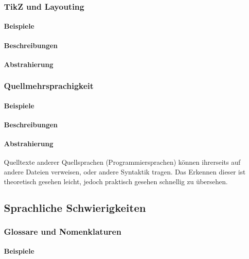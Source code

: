 \subsubsection{TikZ und Layouting}\label{problems:advanced:layouting}
\paragraph*{Beispiele}
\paragraph*{Beschreibungen}
\paragraph*{Abstrahierung}

\subsubsection{Quellmehrsprachigkeit}\label{problems:special:sourcecode}
\paragraph*{Beispiele}
\paragraph*{Beschreibungen}
\paragraph*{Abstrahierung}
Quelltexte anderer Quellsprachen (Programmiersprachen) können ihrerseits auf andere Dateien verweisen, oder andere Syntaktik tragen. Das Erkennen dieser ist theoretisch gesehen leicht, jedoch praktisch gesehen schnellig zu übersehen. 









\subsection{Sprachliche Schwierigkeiten}\label{problems:additional}
\subsubsection{Glossare und Nomenklaturen}
\paragraph*{Beispiele}
